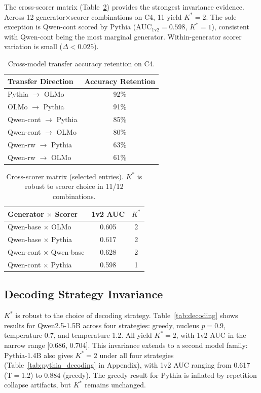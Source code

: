 \documentclass[11pt]{article}
\begin{document}
The cross-scorer matrix (Table~\ref{tab:cross_scorer}) provides the strongest invariance evidence. Across 12 generator$\times$scorer combinations on C4, 11 yield $K^* = 2$. The sole exception is Qwen-cont scored by Pythia ($\text{AUC}_{1\text{v}2} = 0.598$, $K^* = 1$), consistent with Qwen-cont being the most marginal generator. Within-generator scorer variation is small ($\Delta < 0.025$).

\begin{table}[t]
\centering
\caption{Cross-model transfer accuracy retention on C4.}
\label{tab:transfer}
\small
\begin{tabular}{lc}
\toprule
Transfer Direction & Accuracy Retention \\
\midrule
Pythia $\to$ OLMo & 92\% \\
OLMo $\to$ Pythia & 91\% \\
Qwen-cont $\to$ Pythia & 85\% \\
Qwen-cont $\to$ OLMo & 80\% \\
Qwen-rw $\to$ Pythia & 63\% \\
Qwen-rw $\to$ OLMo & 61\% \\
\bottomrule
\end{tabular}
\end{table}

\begin{table}[t]
\centering
\caption{Cross-scorer matrix (selected entries). $K^*$ is robust to scorer choice in 11/12 combinations.}
\label{tab:cross_scorer}
\small
\begin{tabular}{lcc}
\toprule
Generator $\times$ Scorer & 1v2 AUC & $K^*$ \\
\midrule
Qwen-base $\times$ OLMo & 0.605 & 2 \\
Qwen-base $\times$ Pythia & 0.617 & 2 \\
Qwen-cont $\times$ Qwen-base & 0.628 & 2 \\
Qwen-cont $\times$ Pythia & 0.598 & 1 \\
\bottomrule
\end{tabular}
\end{table}

\subsection{Decoding Strategy Invariance}

$K^*$ is robust to the choice of decoding strategy. Table~\ref{tab:decoding} shows results for Qwen2.5-1.5B across four strategies: greedy, nucleus $p{=}0.9$, temperature 0.7, and temperature 1.2. All yield $K^* = 2$, with 1v2 AUC in the narrow range [0.686, 0.704]. This invariance extends to a second model family: Pythia-1.4B also gives $K^* = 2$ under all four strategies (Table~\ref{tab:pythia_decoding} in Appendix), with 1v2 AUC ranging from 0.617 (T$=$1.2) to 0.884 (greedy). The greedy result for Pythia is inflated by repetition collapse artifacts, but $K^*$ remains unchanged.
\end{document}
